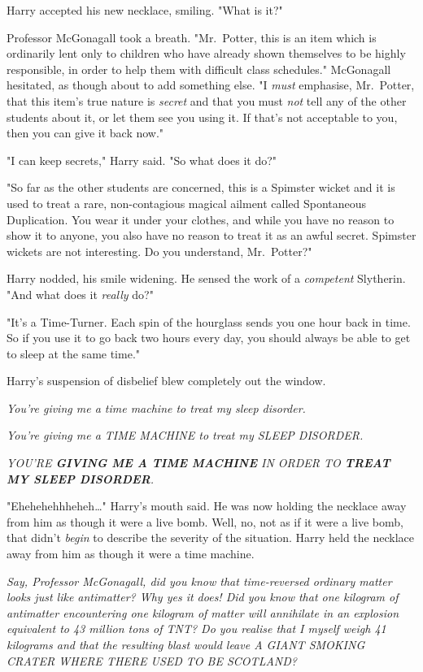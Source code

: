 Harry accepted his new necklace, smiling. "What is it?"

Professor McGonagall took a breath. "Mr.~Potter, this is an item which is
ordinarily lent only to children who have already shown themselves to be highly
responsible, in order to help them with difficult class schedules." McGonagall
hesitated, as though about to add something else. "I \emph{must} emphasise,
Mr.~Potter, that this item's true nature is \emph{secret} and that you
must \emph{not} tell any of the other students about it, or let them see you
using it. If that's not acceptable to you, then you can give it back now."

"I can keep secrets," Harry said. "So what does it do?"

"So far as the other students are concerned, this is a Spimster wicket and it
is used to treat a rare, non-contagious magical ailment called Spontaneous
Duplication. You wear it under your clothes, and while you have no reason to
show it to anyone, you also have no reason to treat it as an awful secret.
Spimster wickets are not interesting. Do you understand, Mr.~Potter?"

Harry nodded, his smile widening. He sensed the work of a \emph{competent}
Slytherin. "And what does it \emph{really} do?"

"It's a Time-Turner. Each spin of the hourglass sends you one hour back in
time. So if you use it to go back two hours every day, you should always be
able to get to sleep at the same time."

Harry's suspension of disbelief blew completely out the window.

\emph{You're giving me a time machine to treat my sleep disorder.}

\emph{You're giving me a TIME MACHINE to treat my SLEEP DISORDER.}

\emph{YOU'RE \textbf{GIVING ME A TIME MACHINE} IN ORDER TO
\textbf{TREAT MY SLEEP DISORDER}.}

"Ehehehehhheheh{\ldots}" Harry's mouth said. He was now holding the necklace
away from him as though it were a live bomb. Well, no, not as if it were a live
bomb, that didn't \emph{begin} to describe the severity of the situation. Harry
held the necklace away from him as though it were a time machine.

\emph{Say, Professor McGonagall, did you know that time-reversed ordinary
matter looks just like antimatter? Why yes it does! Did you know that one
kilogram of antimatter encountering one kilogram of matter will annihilate in
an explosion equivalent to 43 million tons of TNT? Do you realise that I myself
weigh 41 kilograms and that the resulting blast would leave A GIANT SMOKING
CRATER WHERE THERE USED TO BE SCOTLAND?}


